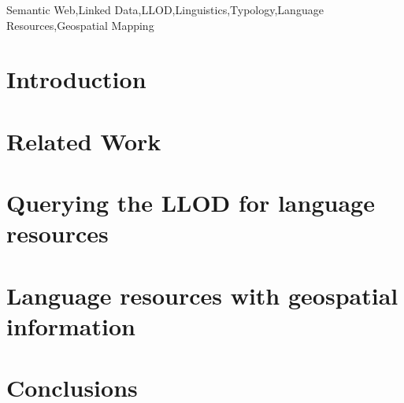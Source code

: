 \documentclass{iosart2c}
\begin{document}
\begin{frontmatter}
\begin{abstract}
\end{abstract}

\begin{keyword}
Semantic Web\sep Linked Data\sep LLOD\sep Linguistics\sep Typology\sep Language Resources\sep Geospatial Mapping
\end{keyword}

\end{frontmatter}


\section{Introduction}


\section{Related Work}


\section{Querying the LLOD for language resources}


\section{Language resources with geospatial information}




\section{Conclusions}

\end{document}
